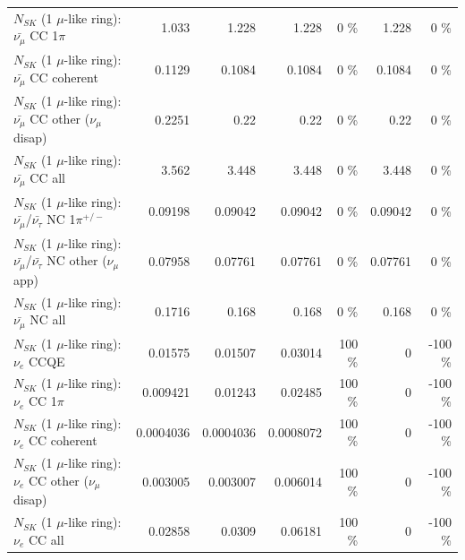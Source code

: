 \begin{table}
\begin{tabular}{| l | r | r | r  r | r  r |}
                         $N_{SK}$ (1 $\mu$-like ring): $\bar{\nu_\mu}$ CC 1$\pi$ &           1.033 &           1.228 &           1.228 &        0 \%  &           1.228 &        0 \%  \\ 
                       $N_{SK}$ (1 $\mu$-like ring): $\bar{\nu_\mu}$ CC coherent &          0.1129 &          0.1084 &          0.1084 &        0 \%  &          0.1084 &        0 \%  \\ 
        $N_{SK}$ (1 $\mu$-like ring): $\bar{\nu_\mu}$ CC other ($\nu_\mu$ disap) &          0.2251 &            0.22 &            0.22 &        0 \%  &            0.22 &        0 \%  \\ 
                          $N_{SK}$ (1 $\mu$-like ring): $\bar{\nu_{\mu}}$ CC all &           3.562 &           3.448 &           3.448 &        0 \%  &           3.448 &        0 \%  \\ 
\hline
  $N_{SK}$ (1 $\mu$-like ring): $\bar{\nu_\mu}$/$\bar{\nu_\tau}$ NC 1$\pi^{+/-}$ &         0.09198 &         0.09042 &         0.09042 &        0 \%  &         0.09042 &        0 \%  \\ 
$N_{SK}$ (1 $\mu$-like ring): $\bar{\nu_\mu}$/$\bar{\nu_\tau}$ NC other ($\nu_\mu$ app) &         0.07958 &         0.07761 &         0.07761 &        0 \%  &         0.07761 &        0 \%  \\ 
                          $N_{SK}$ (1 $\mu$-like ring): $\bar{\nu_{\mu}}$ NC all &          0.1716 &           0.168 &           0.168 &        0 \%  &           0.168 &        0 \%  \\ 
\hline
\hline
\hline
                                      $N_{SK}$ (1 $\mu$-like ring): $\nu_e$ CCQE &         0.01575 &         0.01507 &         0.03014 &      100 \%  &               0 &     -100 \%  \\ 
                                 $N_{SK}$ (1 $\mu$-like ring): $\nu_e$ CC 1$\pi$ &        0.009421 &         0.01243 &         0.02485 &      100 \%  &               0 &     -100 \%  \\ 
                               $N_{SK}$ (1 $\mu$-like ring): $\nu_e$ CC coherent &       0.0004036 &       0.0004036 &       0.0008072 &      100 \%  &               0 &     -100 \%  \\ 
                $N_{SK}$ (1 $\mu$-like ring): $\nu_e$ CC other ($\nu_\mu$ disap) &        0.003005 &        0.003007 &        0.006014 &      100 \%  &               0 &     -100 \%  \\ 
                                  $N_{SK}$ (1 $\mu$-like ring): $\nu_{e}$ CC all &         0.02858 &          0.0309 &         0.06181 &      100 \%  &               0 &     -100 \%  \\ 

\end{tabular}
\end{table}
